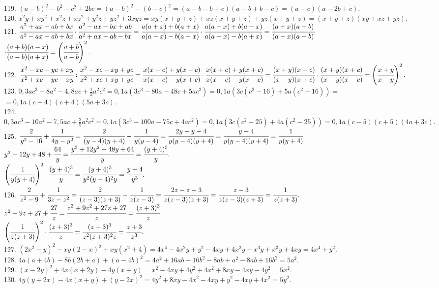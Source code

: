 119. $(a-b)^2-b^2-c^2+2bc=(a-b)^2-(b-c)^2=(a-b-b+c)(a-b+b-c)=(a-c)(a-2b+c).$\\
120. $x^2y+xy^2+x^2z+xz^2+y^2z+yz^2+3xyz=xy(x+y+z)+xz(x+y+z)+yz(x+y+z)=(x+y+z)(xy+xz+yz).$\\
121. $\cfrac{a^2+ax+ab+bx}{a^2-ax-ab+bx}\cdot\cfrac{a^2-ax-bx+ab}{a^2+ax-ab-bx}=\cfrac{a(a+x)+b(a+x)}{a(a-x)-b(a-x)}\cdot\cfrac{a(a-x)+b(a-x)}{a(a+x)-b(a+x)}=
\cfrac{(a+x)(a+b)}{(a-x)(a-b)}\cdot$\\$\cdot\cfrac{(a+b)(a-x)}{(a-b)(a+x)}=\left(\cfrac{a+b}{a-b}\right)^2.$\\
122. $\cfrac{x^2-xc-yc+xy}{x^2+xc-yc-xy}:\cfrac{x^2-xc-xy+yc}{x^2+xc+xy+yc}=\cfrac{x(x-c)+y(x-c)}{x(x+c)-y(x+c)}\cdot\cfrac{x(x+c)+y(x+c)}{x(x-c)-y(x-c)}=
\cfrac{(x+y)(x-c)}{(x-y)(x+c)}\cdot\cfrac{(x+y)(x+c)}{(x-y)(x-c)}=\left(\cfrac{x+y}{x-y}\right)^2.$\\
123. $0,3ac^3-8a^2-4,8ac+\frac{1}{2}a^2c^2=0,1a(3c^3-80a-48c+5ac^2)=0,1a(3c(c^2-16)+5a(c^2-16))=$\\$=0,1a(c-4)(c+4)(5a+3c).$\\
124. $0,3ac^3-10a^2-7,5ac+\frac{2}{5}a^2c^2=0,1a(3c^3-100a-75c+4ac^2)=0,1a(3c(c^2-25)+4a(c^2-25))=0,1a(c-5)(c+5)(4a+3c).$\\
125. $\cfrac{2}{y^2-16}+\cfrac{1}{4y-y^2}=\cfrac{2}{(y-4)(y+4)}-\cfrac{1}{y(y-4)}=\cfrac{2y-y-4}{y(y-4)(y+4)}=\cfrac{y-4}{y(y-4)(y+4)}=\cfrac{1}{y(y+4)}.$\\
$y^2+12y+48+\cfrac{64}{y}=\cfrac{y^3+12y^2+48y+64}{y}=\cfrac{(y+4)^3}{y}.$\\
$\left(\cfrac{1}{y(y+4)}\right)^2\cdot\cfrac{(y+4)^3}{y}=\cfrac{(y+4)^3}{y^2(y+4)^2y}=\cfrac{y+4}{y^3}.$\\
126. $\cfrac{2}{z^2-9}+\cfrac{1}{3z-z^2}=\cfrac{2}{(z-3)(z+3)}-\cfrac{1}{z(z-3)}=\cfrac{2z-z-3}{z(z-3)(z+3)}=\cfrac{z-3}{z(z-3)(z+3)}=\cfrac{1}{z(z+3)}.$\\
$z^2+9z+27+\cfrac{27}{z}=\cfrac{z^3+9z^2+27z+27}{z}=\cfrac{(z+3)^3}{z}.$\\
$\left(\cfrac{1}{z(z+3)}\right)^2\cdot\cfrac{(z+3)^3}{z}=\cfrac{(z+3)^3}{z^2(z+3)^2z}=\cfrac{z+3}{z^3}.$\\
127. $(2x^2-y)^2-xy(2-x)^2+xy(x^2+4)=4x^4-4x^2y+y^2-4xy+4x^2y-x^3y+x^3y+4xy=4x^4+y^2.$\\
128. $4a(a+4b)-8b(2b+a)+(a-4b)^2=4a^2+16ab-16b^2-8ab+a^2-8ab+16b^2=5a^2.$\\
129. $(x-2y)^2+4x(x+2y)-4y(x+y)=x^2-4xy+4y^2+4x^2+8xy-4xy-4y^2=5x^2.$\\
130. $4y(y+2x)-4x(x+y)+(y-2x)^2=4y^2+8xy-4x^2-4xy+y^2-4xy+4x^2=5y^2.$\\
